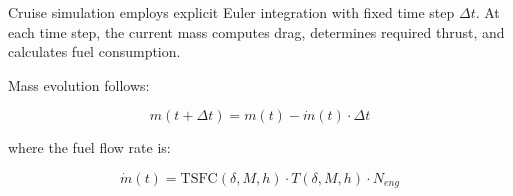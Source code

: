 Cruise simulation employs explicit Euler integration with fixed time step $\Delta t$. At each time step, the current mass computes drag, determines required thrust, and calculates fuel consumption.

Mass evolution follows:

\begin{equation}
m(t + \Delta t) = m(t) - \dot{m}(t) \cdot \Delta t
\end{equation}

where the fuel flow rate is:

\begin{equation}
\dot{m}(t) = \text{TSFC}(\delta, M, h) \cdot T(\delta, M, h) \cdot N_{eng}
\end{equation}
 
